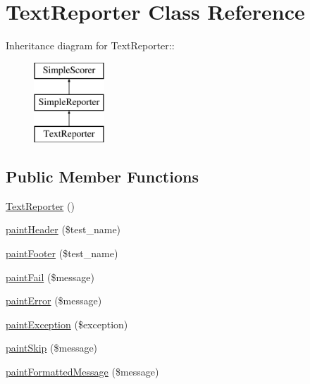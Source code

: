 \hypertarget{class_text_reporter}{
\section{TextReporter Class Reference}
\label{class_text_reporter}
}
Inheritance diagram for TextReporter::\begin{figure}[H]
\begin{center}
\leavevmode
\includegraphics[height=3cm]{class_text_reporter}
\end{center}
\end{figure}
\subsection*{Public Member Functions}
\begin{DoxyCompactItemize}
\item 
\hyperlink{class_text_reporter_ac26356a45919f2e713ccef2c37a82eb8}{TextReporter} ()
\item 
\hyperlink{class_text_reporter_a0ad9d130d152c3fa6a56b65f599f34ca}{paintHeader} (\$test\_\-name)
\item 
\hyperlink{class_text_reporter_af40b27732bf32f71ad4f2ebee6417667}{paintFooter} (\$test\_\-name)
\item 
\hyperlink{class_text_reporter_a2163ad5700b27e62efe530849664db5d}{paintFail} (\$message)
\item 
\hyperlink{class_text_reporter_a1318de43ace9fbf493eef1aa6059c0da}{paintError} (\$message)
\item 
\hyperlink{class_text_reporter_a277a5065cf8be1cd0ea7880d7e599d51}{paintException} (\$exception)
\item 
\hyperlink{class_text_reporter_a3577d6c0e6e237592c2b37b79ff3d717}{paintSkip} (\$message)
\item 
\hyperlink{class_text_reporter_ac308a6d3632656270578474b0b752b06}{paintFormattedMessage} (\$message)
\end{DoxyCompactItemize}


